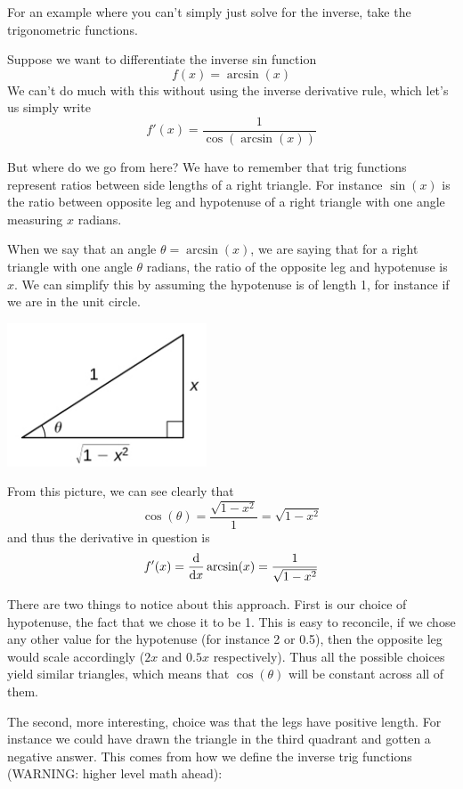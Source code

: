 For an example where you can't simply just solve for the inverse, take the trigonometric functions.
\begin{example}
	Suppose we want to differentiate the inverse sin function
	\[ f(x) = \arcsin(x) \]
	We can't do much with this without using the inverse derivative rule, which let's us simply write
	\[ f'(x) = \frac{1}{\cos(\arcsin(x))} \]
	
	But where do we go from here? We have to remember that trig functions represent ratios between side lengths of a right triangle. For instance $\sin(x)$ is the ratio between opposite leg and hypotenuse of a right triangle with one angle measuring $x$ radians.
	
	When we say that an angle $\theta = \arcsin(x)$, we are saying that for a right triangle with one angle $\theta$ radians, the ratio of the opposite leg and hypotenuse is $x$. We can simplify this by assuming the hypotenuse is of length 1, for instance if we are in the unit circle.
	\begin{center}
		\includegraphics[scale=1]{images/Figure 3.3.1.png}
	\end{center}
	
	From this picture, we can see clearly that 
	\[ \cos(\theta) = \frac{\sqrt{1 - x^2}}{1} = \sqrt{1 - x^2} \]
	and thus the derivative in question is
	\[ f'(x) = \dv{x} \arcsin(x) = \frac{1}{\sqrt{1 - x^2}} \]
	
	There are two things to notice about this approach. First is our choice of hypotenuse, the fact that we chose it to be 1. This is easy to reconcile, if we chose any other value for the hypotenuse (for instance 2 or 0.5), then the opposite leg would scale accordingly ($2x$ and $0.5x$ respectively). Thus all the possible choices yield similar triangles, which means that $\cos(\theta)$ will be constant across all of them.
	
	The second, more interesting, choice was that the legs have positive length. For instance we could have drawn the triangle in the third quadrant and gotten a negative answer. This comes from how we define the inverse trig functions (WARNING: higher level math ahead):
	

\end{example}
